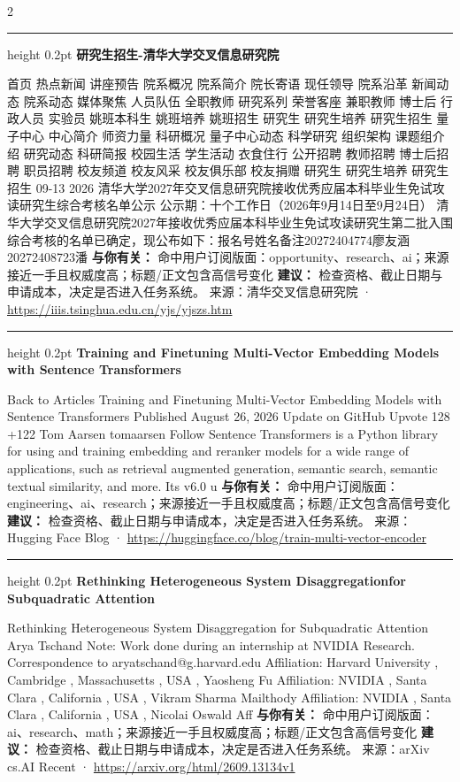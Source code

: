 \documentclass[10.5pt]{ctexart}
\begin{document}
\begin{multicols}{2}
\hrule height 0.2pt
\vspace{2mm}
{\large\bfseries 研究生招生-清华大学交叉信息研究院}\par
首页 热点新闻 讲座预告 院系概况 院系简介 院长寄语 现任领导 院系沿革 新闻动态 院系动态 媒体聚焦 人员队伍 全职教师 研究系列 荣誉客座 兼职教师 博士后 行政人员 实验员 姚班本科生 姚班培养 姚班招生 研究生 研究生培养 研究生招生 量子中心 中心简介 师资力量 科研概况 量子中心动态 科学研究 组织架构 课题组介绍 研究动态 科研简报 校园生活 学生活动 衣食住行 公开招聘 教师招聘 博士后招聘 职员招聘 校友频道 校友风采 校友俱乐部 校友捐赠 研究生 研究生培养 研究生招生 09-13 2026 清华大学2027年交叉信息研究院接收优秀应届本科毕业生免试攻读研究生综合考核名单公示 公示期：十个工作日（2026年9月14日至9月24日） 清华大学交叉信息研究院2027年接收优秀应届本科毕业生免试攻读研究生第二批入围综合考核的名单已确定，现公布如下：报名号姓名备注20272404774廖友涵20272408723潘
\textbf{与你有关：} 命中用户订阅版面：opportunity、research、ai；来源接近一手且权威度高；标题/正文包含高信号变化
\textbf{建议：} 检查资格、截止日期与申请成本，决定是否进入任务系统。
{\footnotesize\color{ormuted} 来源：清华交叉信息研究院 · \url{https://iiis.tsinghua.edu.cn/yjs/yjszs.htm}}
\vspace{2mm}
\hrule height 0.2pt
\vspace{2mm}
{\large\bfseries Training and Finetuning Multi-Vector Embedding Models with Sentence Transformers}\par
Back to Articles Training and Finetuning Multi-Vector Embedding Models with Sentence Transformers Published August 26, 2026 Update on GitHub Upvote 128 +122 Tom Aarsen tomaarsen Follow Sentence Transformers is a Python library for using and training embedding and reranker models for a wide range of applications, such as retrieval augmented generation, semantic search, semantic textual similarity, and more. Its v6.0 u
\textbf{与你有关：} 命中用户订阅版面：engineering、ai、research；来源接近一手且权威度高；标题/正文包含高信号变化
\textbf{建议：} 检查资格、截止日期与申请成本，决定是否进入任务系统。
{\footnotesize\color{ormuted} 来源：Hugging Face Blog · \url{https://huggingface.co/blog/train-multi-vector-encoder}}
\vspace{2mm}
\hrule height 0.2pt
\vspace{2mm}
{\large\bfseries Rethinking Heterogeneous System Disaggregationfor Subquadratic Attention}\par
Rethinking Heterogeneous System Disaggregation for Subquadratic Attention Arya Tschand Note: Work done during an internship at NVIDIA Research. Correspondence to aryatschand@g.harvard.edu Affiliation: Harvard University , Cambridge , Massachusetts , USA , Yaosheng Fu Affiliation: NVIDIA , Santa Clara , California , USA , Vikram Sharma Mailthody Affiliation: NVIDIA , Santa Clara , California , USA , Nicolai Oswald Aff
\textbf{与你有关：} 命中用户订阅版面：ai、research、math；来源接近一手且权威度高；标题/正文包含高信号变化
\textbf{建议：} 检查资格、截止日期与申请成本，决定是否进入任务系统。
{\footnotesize\color{ormuted} 来源：arXiv cs.AI Recent · \url{https://arxiv.org/html/2609.13134v1}}
\end{multicols}
\end{document}
